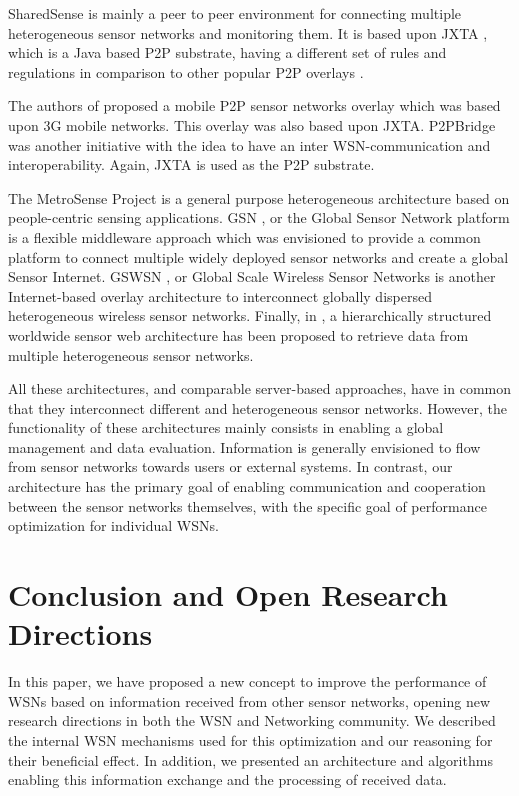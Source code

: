 \documentclass[onecolumn]{jaise2e}
\begin{document}
SharedSense \cite{ref-journal4} is mainly a peer to peer environment for connecting multiple heterogeneous sensor networks and monitoring them. It is based upon JXTA \cite{ref-journal5}, which is a Java based P2P substrate, having a different set of rules and regulations in comparison to other popular P2P overlays \cite{ref-journal6}. 

The authors of \cite{ref-journal7} proposed a mobile P2P sensor networks overlay which was based upon 3G mobile networks. This overlay was also based upon JXTA. P2PBridge \cite{ref-journal8, ref-journal9} was another initiative with the idea to have an inter WSN-communication and interoperability. Again, JXTA is used as the P2P substrate. 

The MetroSense Project \cite{ref-journal10} is a general purpose heterogeneous architecture based on people-centric sensing applications. GSN \cite{ref-journal11}, or the Global Sensor Network platform is a flexible middleware approach which was envisioned to provide a common platform to connect multiple widely deployed sensor networks and create a global Sensor Internet. GSWSN \cite{ref-journal12}, or Global Scale Wireless Sensor Networks is another Internet-based overlay architecture to interconnect globally dispersed heterogeneous wireless sensor networks. Finally, in \cite{ref-journal13}, a hierarchically structured worldwide sensor web architecture has been proposed to retrieve data from multiple heterogeneous sensor networks.

All these architectures, and comparable server-based approaches, have in common that they interconnect different and heterogeneous sensor networks. However, the functionality of these architectures mainly consists in enabling a global management and data evaluation. Information is generally envisioned to flow from sensor networks towards users or external systems. In contrast, our architecture has the primary goal of enabling communication and cooperation between the sensor networks themselves, with the specific goal of performance optimization for individual WSNs.



\section{Conclusion and Open Research Directions}\label{sec:conc}

In this paper, we have proposed a new concept to improve the performance of WSNs based on information received from other sensor networks, opening new research directions in both the WSN and Networking community. We described the internal WSN mechanisms used for this optimization and our reasoning for their beneficial effect. In addition, we presented an architecture and algorithms enabling this information exchange and the processing of received data. 
\end{document}
